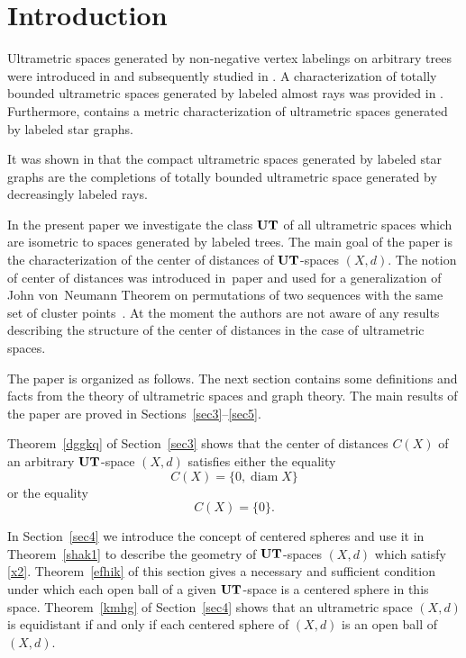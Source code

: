 \documentclass{article}
\begin{document}
\section{Introduction}


Ultrametric spaces generated by non-negative vertex labelings on arbitrary trees were introduced in \cite{Dov2020TaAoG} and subsequently studied in \cite{DK2024DLPSSAG,DK2022LTGCCaDUS}.  
A characterization of totally bounded ultrametric spaces generated by labeled almost rays was provided in \cite{DV2025JMS}. Furthermore, \cite{DR2025USGbLSG} contains a metric characterization of ultrametric spaces generated by labeled star graphs.

It was shown in \cite{DCR2025OJAC} that the compact ultrametric spaces generated by labeled star graphs are the completions of totally bounded ultrametric space generated by decreasingly labeled rays.




In the present paper we investigate the class ${\bf UT}$ of all ultrametric spaces which are isometric to spaces generated by labeled trees. The main goal of the paper is the characterization of the center of distances of ${\bf UT}$-spaces $(X,d)$. 
The notion of center of distances was introduced in~paper \cite{BPW2018} and used for a generalization of John von~Neumann Theorem on permutations of two sequences with the same set of cluster points~\cite{Neumann1935}.  At the moment the authors are not aware of any results describing the structure of the center of distances in the case of ultrametric spaces.


The paper is organized as follows.
The next section contains some definitions and facts from the theory of ultrametric spaces and graph theory. The main results of the paper are proved in Sections~\ref{sec3}--\ref{sec5}.

Theorem~\ref{dggkq} of Section~\ref{sec3} shows that the center of distances $C(X)$ of an arbitrary ${\bf UT}$-space $(X,d)$ satisfies either the equality
\begin{equation}
    \label{x2}
C(X)=\{0,\operatorname{diam} X\}
\end{equation}
or the equality
\begin{equation}
    \label{x1}
C(X)=\{0\}.
\end{equation}


In Section~\ref{sec4} we introduce the concept of centered spheres and use it in Theorem~\ref{shak1} to describe the geometry of ${\bf UT}$-spaces $(X,d)$ which satisfy \eqref{x2}. Theorem~\ref{efhik} of this section  gives a necessary and sufficient condition    under which each open ball of a given ${\bf UT}$-space is a centered  sphere in this space.
Theorem~\ref{kmhg} of Section~\ref{sec4} shows that an ultrametric space $(X,d)$ is equidistant if and only if each centered sphere of $(X,d)$ is an open ball of $(X,d)$.
\end{document}
